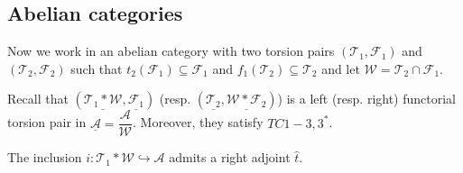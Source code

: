 \subsection{Abelian categories}

Now we work in an abelian category with two torsion pairs $(\mathcal{T}_1,\mathcal{F}_1)$
and $(\mathcal{T}_2,\mathcal{F}_2)$ such that $t_2(\mathcal{F}_1)\subseteq \mathcal{F}_1$ and
$f_1(\mathcal{T}_2)\subseteq \mathcal{T}_2$ and let $\mathcal{W}=\mathcal{T}_2\cap\mathcal{F}_1$.

Recall that $(\underline{\mathcal{T}_1\ast\mathcal{W}},\underline{\mathcal{F}_1})$
(resp. $(\underline{\mathcal{T}_2},\underline{\mathcal{W}\ast\mathcal{F}_2})$) is a left (resp. right)
functorial torsion pair in $\underline{\mathcal{A}} = \dfrac{\mathcal{A}}{\mathcal{W}}$. Moreover, they
satisfy $TC1-3,3^*$.

\begin{lemma}
  The inclusion $i:\mathcal{T}_1\ast \mathcal{W}\hookrightarrow \mathcal{A}$ admits a right adjoint
  $\widehat{t}$.
\end{lemma}

